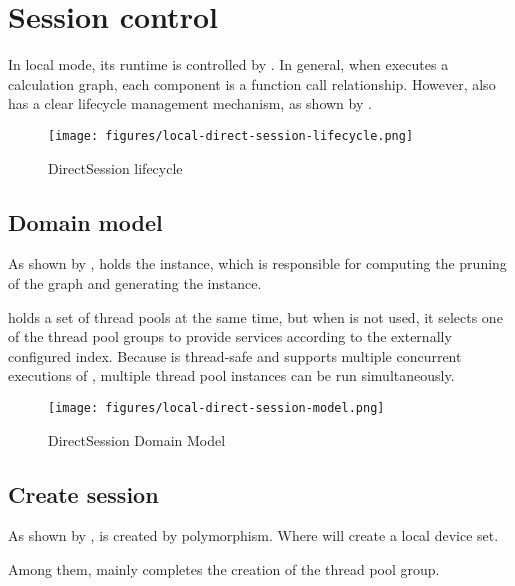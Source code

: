 \section{Session control}
In local mode, its runtime is controlled by . In general, when  executes a calculation graph, each component is a function call relationship. However,  also has a clear lifecycle management mechanism, as shown by .

\begin{figure}[H]
  \centering
  \texttt{[image: figures/local-direct-session-lifecycle.png]}
  \caption{DirectSession lifecycle}
  \label{fig:local-direct-session-lifecycle}
\end{figure}


\subsection{Domain model}
As shown by ,  holds the  instance, which is responsible for computing the pruning of the graph and generating the  instance.

 holds a set of thread pools at the same time, but when  is not used, it selects one of the thread pool groups to provide services according to the externally configured index. Because  is thread-safe and supports multiple concurrent executions of , multiple thread pool instances can be run simultaneously.

\begin{figure}[H]
  \centering
  \texttt{[image: figures/local-direct-session-model.png]}
  \caption{DirectSession Domain Model}
  \label{fig:local-direct-session-model}
\end{figure}


\subsection{Create session}
As shown by ,  is created by  polymorphism. Where  will create a local device set.

Among them,  mainly completes the creation of the thread pool group.

